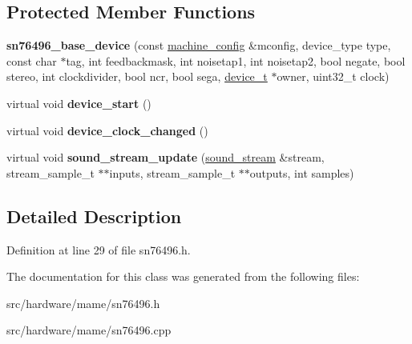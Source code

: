 \subsection*{Protected Member Functions}
\begin{DoxyCompactItemize}
\item 
\hypertarget{classsn76496__base__device_ac6ecab6b2757c53c3846ccdcf5a5c2e8}{{\bfseries sn76496\-\_\-base\-\_\-device} (const \hyperlink{structmachine__config}{machine\-\_\-config} \&mconfig, device\-\_\-type type, const char $\ast$tag, int feedbackmask, int noisetap1, int noisetap2, bool negate, bool stereo, int clockdivider, bool ncr, bool sega, \hyperlink{classdevice__t}{device\-\_\-t} $\ast$owner, uint32\-\_\-t clock)}\label{classsn76496__base__device_ac6ecab6b2757c53c3846ccdcf5a5c2e8}

\item 
\hypertarget{classsn76496__base__device_a02fb042d01988f8248071f7adc22db72}{virtual void {\bfseries device\-\_\-start} ()}\label{classsn76496__base__device_a02fb042d01988f8248071f7adc22db72}

\item 
\hypertarget{classsn76496__base__device_af223f2b3268c7fbaa1ecc521710785be}{virtual void {\bfseries device\-\_\-clock\-\_\-changed} ()}\label{classsn76496__base__device_af223f2b3268c7fbaa1ecc521710785be}

\item 
\hypertarget{classsn76496__base__device_a6c1beb61338df5c901d36b478d1c3945}{virtual void {\bfseries sound\-\_\-stream\-\_\-update} (\hyperlink{structdevice__sound__interface_1_1sound__stream}{sound\-\_\-stream} \&stream, stream\-\_\-sample\-\_\-t $\ast$$\ast$inputs, stream\-\_\-sample\-\_\-t $\ast$$\ast$outputs, int samples)}\label{classsn76496__base__device_a6c1beb61338df5c901d36b478d1c3945}

\end{DoxyCompactItemize}


\subsection{Detailed Description}


Definition at line 29 of file sn76496.\-h.



The documentation for this class was generated from the following files\-:\begin{DoxyCompactItemize}
\item 
src/hardware/mame/sn76496.\-h\item 
src/hardware/mame/sn76496.\-cpp\end{DoxyCompactItemize}
